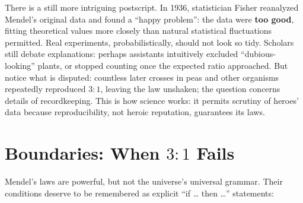 \begin{zhengju}
There is a still more intriguing postscript. In 1936, statistician Fisher reanalyzed Mendel's original data and found a ``happy problem'': the data were \textbf{too good}, fitting theoretical values more closely than natural statistical fluctuations permitted. Real experiments, probabilistically, should not look so tidy. Scholars still debate explanations: perhaps assistants intuitively excluded ``dubious-looking'' plants, or stopped counting once the expected ratio approached. But notice what is disputed: countless later crosses in peas and other organisms repeatedly reproduced $3:1$, leaving the law unshaken; the question concerns details of recordkeeping. This is how science works: it permits scrutiny of heroes' data because reproducibility, not heroic reputation, guarantees its laws.
\end{zhengju}

\section{Boundaries: When $3:1$ Fails}

Mendel's laws are powerful, but not the universe's universal grammar. Their conditions deserve to be remembered as explicit ``if … then …'' statements:

